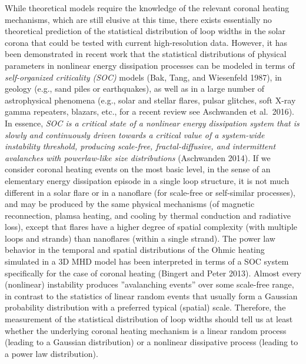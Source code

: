 \documentclass[10pt,preprint]{aastex}  %
\begin{document}
While theoretical models require the knowledge of the relevant
coronal heating mechanisms, which are still elusive at this time,
there exists essentially no theoretical prediction of the statistical
distribution of loop widths in the solar corona that could be tested 
with current high-resolution data. However, it has been demonstrated
in recent work that the statistical distributions of physical parameters 
in nonlinear energy dissipation processes can be modeled in terms of 
{\sl self-organized criticality (SOC)} models (Bak, Tang, and Wiesenfeld
1987), in geology (e.g., sand piles or earthquakes), as well as 
in a large number of astrophysical phenomena (e.g., solar and stellar 
flares, pulsar glitches, soft X-ray gamma repeaters, blazars, etc.,
for a recent review see Aschwanden et al.~2016). In essence, {\it SOC is a 
critical state of a nonlinear energy dissipation system that is slowly 
and continuously driven towards a critical value of a system-wide 
instability threshold, 
producing scale-free, fractal-diffusive, and intermittent avalanches 
with powerlaw-like size distributions} (Aschwanden 2014). 
If we consider coronal heating events on the most basic level, in the 
sense of an elementary energy dissipation episode in a single loop 
structure, it is not much different in a solar flare or in a nanoflare 
(for scale-free or self-similar processes), and may be produced by the 
same physical mechanisms (of magnetic reconnection, plamsa heating, and 
cooling by thermal conduction and radiative loss), except that flares
have a higher degree of spatial complexity (with multiple loops and strands)
than nanoflares (within a single strand).  
The power law behavior in the temporal and spatial distributions of the
Ohmic heating simulated in a 3D MHD model has been interpreted in terms
of a SOC system specifically for the case of coronal heating 
(Bingert and Peter 2013). Almost every
(nonlinear) instability produces ''avalanching events'' over some 
scale-free range, in contrast to the statistics of linear random events 
that usually form a Gaussian probability distribution with a preferred
typical (spatial) scale. Therefore, the measurement of the statistical
distribution of loop widths should tell us at least whether the
underlying coronal heating mechanism is a linear random process 
(leading to a Gaussian distribution) or a nonlinear dissipative process
(leading to a power law distribution).
\end{document}
